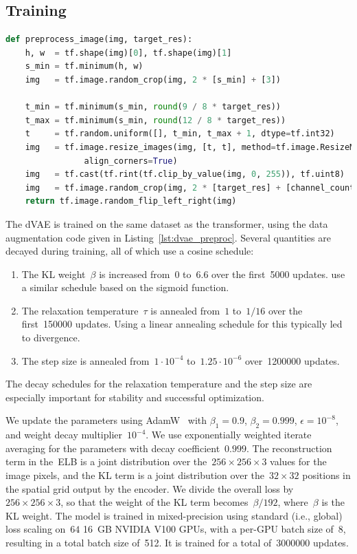 \documentclass{article}
\begin{document}
\subsection{Training}
\label{sec:dvae_train}
%
\begin{lstlisting}[language=Python,basicstyle=\footnotesize\ttfamily,caption={TensorFlow~\cite{abadi2016tensorflow} image preprocessing code for training dVAE. We use \texttt{target\_res = 256} and \texttt{channel\_count = 3}.},label={lst:dvae_preproc},captionpos=b,float=tp,floatplacement=tbp]
def preprocess_image(img, target_res):
    h, w  = tf.shape(img)[0], tf.shape(img)[1]
    s_min = tf.minimum(h, w)
    img   = tf.image.random_crop(img, 2 * [s_min] + [3])

    t_min = tf.minimum(s_min, round(9 / 8 * target_res))
    t_max = tf.minimum(s_min, round(12 / 8 * target_res))
    t     = tf.random.uniform([], t_min, t_max + 1, dtype=tf.int32)
    img   = tf.image.resize_images(img, [t, t], method=tf.image.ResizeMethod.AREA,
                align_corners=True)
    img   = tf.cast(tf.rint(tf.clip_by_value(img, 0, 255)), tf.uint8)
    img   = tf.image.random_crop(img, 2 * [target_res] + [channel_count])
    return tf.image.random_flip_left_right(img)
\end{lstlisting}
%
The dVAE is trained on the same dataset as the transformer, using the data augmentation code given in Listing~\ref{lst:dvae_preproc}. Several quantities are decayed during training, all of which use a cosine schedule:
\begin{enumerate}
    \item The KL weight~$\beta$ is increased from~$0$ to~$6.6$ over the first~\num{5000} updates. \citet{bowman2015generating} use a similar schedule based on the sigmoid function.
    \item The relaxation temperature~$\tau$ is annealed from~$1$ to~$1 / 16$ over the first~\num{150000} updates. Using a linear annealing schedule for this typically led to divergence.
    \item The step size is annealed from~$1 \cdot 10^{-4}$ to~$1.25 \cdot 10^{-6}$ over~\num{1200000} updates.
\end{enumerate}
The decay schedules for the relaxation temperature and the step size are especially important for stability and successful optimization.

We update the parameters using AdamW~\cite{loshchilov2017decoupled} with $\beta_1=0.9$, $\beta_2=0.999$, $\epsilon=10^{-8}$, and weight decay multiplier~$10^{-4}$. We use exponentially weighted iterate averaging for the parameters with decay coefficient~$0.999$. The reconstruction term in the~ELB is a joint distribution over the~$256 \times 256 \times 3$ values for the image pixels, and the KL term is a joint distribution over the~$32 \times 32$ positions in the spatial grid output by the encoder. We divide the overall loss by~$256 \times 256 \times 3$, so that the weight of the KL term becomes~$\beta / 192$, where~$\beta$ is the KL weight. The model is trained in mixed-precision using standard (i.e., global) loss scaling on~$64$ 16~GB NVIDIA V100 GPUs, with a per-GPU batch size of~$8$, resulting in a total batch size of~512. It is trained for a total of~\num{3000000} updates.
\end{document}
